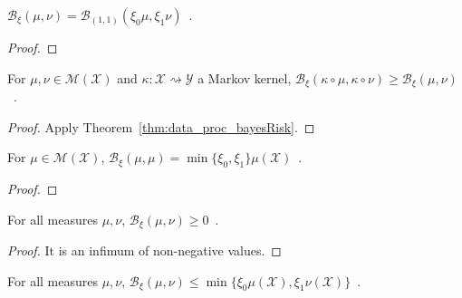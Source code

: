 \begin{lemma}
  \label{lem:bayesBinaryRisk_one_one}
  \leanok
  $\mathcal B_\xi(\mu, \nu) = \mathcal B_{(1,1)}(\xi_0\mu, \xi_1\nu)$~.
\end{lemma}

\begin{proof}\leanok
{}

\end{proof}

\begin{theorem}
  \label{thm:data_proc_bayesBinaryRisk}
  \leanok
  For $\mu, \nu \in \mathcal M(\mathcal X)$ and $\kappa : \mathcal X \rightsquigarrow \mathcal Y$ a Markov kernel, $\mathcal B_\xi(\kappa \circ \mu, \kappa \circ \nu) \ge \mathcal B_\xi(\mu, \nu)$~.
\end{theorem}

\begin{proof}\leanok
{}
Apply Theorem~\ref{thm:data_proc_bayesRisk}.
\end{proof}

\begin{lemma}
  \label{lem:bayesBinaryRisk_self}
  \leanok
  For $\mu \in \mathcal M(\mathcal X)$, $\mathcal B_\xi(\mu, \mu) = \min\{\xi_0, \xi_1\} \mu(\mathcal X)$~.
\end{lemma}

\begin{proof}\leanok
\uses{}
\end{proof}

\begin{lemma}
  \label{lem:bayesBinaryRisk_nonneg}
  For all measures $\mu, \nu$, $\mathcal B_\xi(\mu, \nu) \ge 0$~.
\end{lemma}

\begin{proof}%
\uses{}
It is an infimum of non-negative values.
\end{proof}

\begin{lemma}
  \label{lem:bayesBinaryRisk_le}
  \leanok
  For all measures $\mu, \nu$, $\mathcal B_\xi(\mu, \nu) \le \min\{\xi_0 \mu(\mathcal X), \xi_1 \nu(\mathcal X)\}$~.
\end{lemma}

